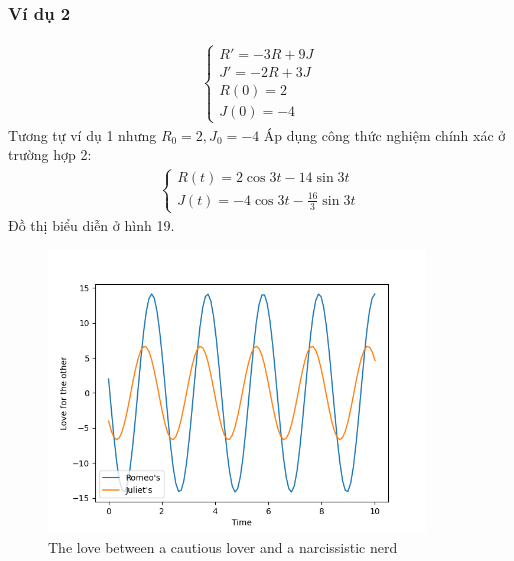\subsubsection{Ví dụ 2}
\begin{align*}
    \begin{cases}
        R'=-3R+9J\\
        J'=-2R+3J\\
        R(0)=2\\
        J(0)=-4
    \end{cases}
\end{align*}
Tương tự ví dụ 1 nhưng $R_0 = 2, J_0 = -4$ Áp dụng công thức nghiệm chính xác ở trường hợp 2:
\begin{align*}
    \begin{cases}
        R(t)=2\cos{3t}-14\sin{3t}\\
        J(t)=-4\cos{3t}-\frac{16}{3}\sin{3t}
    \end{cases}
\end{align*}
Đồ thị biểu diễn ở hình 19.
\begin{figure}[h!]
    \begin{center}
    \includegraphics[width=10cm]{images/cautious_lover_2.png}
    \end{center}
    \caption{The love between a cautious lover and a narcissistic nerd}
\end{figure}
